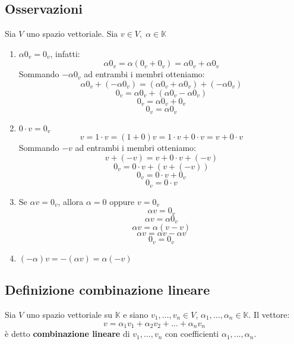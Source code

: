 \documentclass[a4paper]{article}
\theoremstyle{break}
\theoremstyle{break}
\theoremstyle{break}
\theoremstyle{break}
\begin{document}
  \subsection{Osservazioni}
  Sia \( V \) uno spazio vettoriale. Sia \( v \in V,\; \alpha \in \mathbb{K} \) 
  \begin{enumerate}
    \item \( \alpha 0_v = 0_v \), infatti:
      \[
      \alpha 0_v = \alpha (0_v + 0_v) = \alpha 0_v + \alpha 0_v
      \] 
      Sommando \( -\alpha 0_v \) ad entrambi i membri otteniamo:
      \[
      \alpha 0_v + (-\alpha 0_v) = (\alpha 0_v + \alpha 0_v) + (-\alpha 0_v)
      \] 
      \[
      0_v = \alpha 0_v + (\alpha 0_v - \alpha 0_v)
      \] 
      \[
      0_v  = \alpha 0_v + 0_v
      \] 
      \[
      0_v = \alpha 0_v
      \] 
    \item \( 0 \cdot v = 0_v \)
      \[
      v = 1 \cdot v = (1+0)v = 1 \cdot v + 0 \cdot v = v + 0 \cdot v
      \] 
      Sommando \( -v \) ad entrambi i membri otteniamo:
      \[
      v + (-v) = v + 0 \cdot v + (-v)
      \] 
      \[
      0_v = 0 \cdot v + (v + (-v))
      \] 
      \[
      0_v = 0 \cdot v + 0_v
      \] 
      \[
      0_v = 0 \cdot v
      \] 

    \item Se \( \alpha v = 0_v \), allora \( \alpha = 0 \) oppure \( v = 0_v \) 
      \[
      \alpha v = 0_v
      \] 
      \[
      \alpha v = \alpha 0_v
      \] 
      \[
      \alpha v = \alpha (v - v)
      \] 
      \[
      \alpha v = \alpha v - \alpha v
      \] 
      \[
      0_v = 0_v
      \]

    \item \( (-\alpha)v = -(\alpha v) = \alpha (-v) \) 
  \end{enumerate}

  \subsection{Definizione combinazione lineare}
  Sia \( V \) uno spazio vettoriale su \( \mathbb{K} \) e siano \( v_1, \ldots, v_n \in V \),
  \( \alpha_1, \ldots, \alpha_n \in \mathbb{K} \). Il vettore:
  \[
  v = \alpha_1 v_1 + \alpha_2 v_2 + \ldots + \alpha_n v_n
  \] 
  è detto \textbf{combinazione lineare} di \( v_1, \ldots, v_n \) con coefficienti
  \( \alpha_1, \ldots, \alpha_n \).
\end{document}
